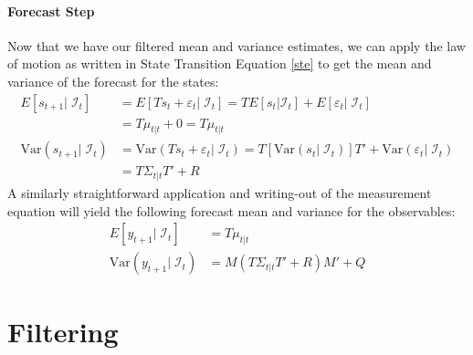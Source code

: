\documentclass[a4paper,12pt]{article}
\begin{document}
\paragraph{Forecast Step} Now that we have our filtered
mean and variance estimates, we can apply the law of
motion as written in State Transition Equation \ref{ste} to get the mean and variance of the forecast for
the states:
\begin{align*}
  E[s_{t+1}|\;\mathcal{I}_{t}] &= 
    E[Ts_t + \varepsilon_t |\;\mathcal{I}_{t}] = 
    TE[s_t | \mathcal{I}_{t}] 
    + E[\varepsilon_t |\;\mathcal{I}_{t}]  \\
    &= T\mu_{t|t} + 0 = T\mu_{t|t} \\
  \text{Var}(s_{t+1}|\;\mathcal{I}_{t})
  &= \text{Var}(Ts_t + \varepsilon_t |\;\mathcal{I}_{t})
  = T[\text{Var}(s_t|\;\mathcal{I}_{t})]T'
  + \text{Var}(\varepsilon_t|\;\mathcal{I}_{t}) \\
  &= T\Sigma_{t|t}T' + R
\end{align*}
A similarly straightforward application and writing-out of
the measurement equation will yield the following forecast
mean and variance for the observables:
\begin{align*}
  E[y_{t+1}|\;\mathcal{I}_{t}] &= T\mu_{t|t} \\
  \text{Var}(y_{t+1}|\;\mathcal{I}_{t})
    &= M\left(T\Sigma_{t|t}T' + R\right)M' + Q
\end{align*}



\section{Filtering}
\end{document}
